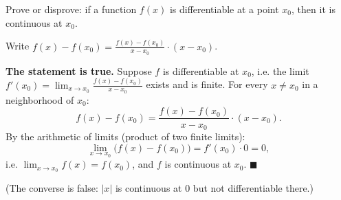 
\begin{question}
Prove or disprove: if a function $f(x)$ is differentiable at a point $x_0$, then it is continuous at $x_0$.
\end{question}

\begin{hint}
Write $f(x)-f(x_0)=\frac{f(x)-f(x_0)}{x-x_0}\cdot(x-x_0)$.
\end{hint}

\begin{solution}
\textbf{The statement is true.} Suppose $f$ is differentiable at $x_0$, i.e. the limit $f'(x_0)=\lim_{x\to x_0}\frac{f(x)-f(x_0)}{x-x_0}$ exists and is finite. For every $x\ne x_0$ in a neighborhood of $x_0$:
\[ f(x)-f(x_0)=\frac{f(x)-f(x_0)}{x-x_0}\cdot(x-x_0). \]
By the arithmetic of limits (product of two finite limits):
\[ \lim_{x\to x_0}\big(f(x)-f(x_0)\big)=f'(x_0)\cdot0=0, \]
i.e. $\lim_{x\to x_0}f(x)=f(x_0)$, and $f$ is continuous at $x_0$. $\blacksquare$

(The converse is false: $|x|$ is continuous at $0$ but not differentiable there.)
\end{solution}
